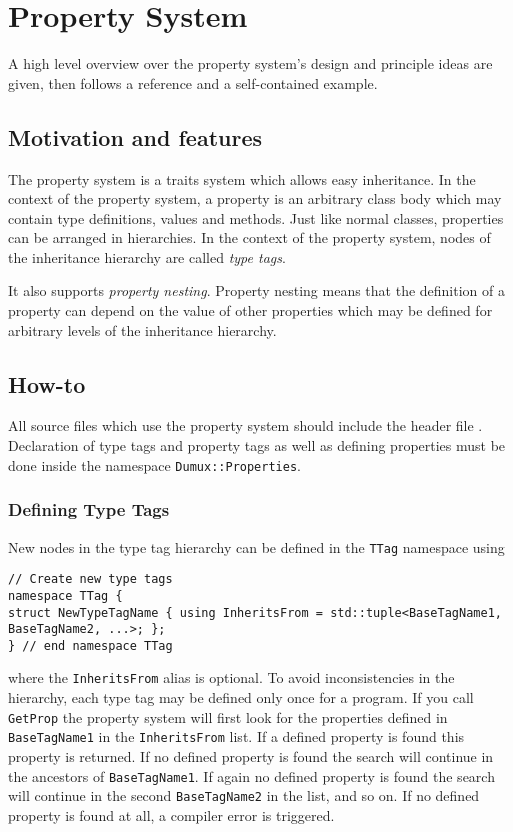 \section{Property System}
\label{sec:propertysystem}
A high level overview over the property system's design and principle ideas
are given, then follows a reference and a self-contained example.

\subsection{Motivation and features}
The \Dumux property system is a traits system
which allows easy inheritance.
In the context of the \Dumux property system, a property is an arbitrary
class body which may contain type definitions, values and methods.
Just like normal classes, properties can be arranged in hierarchies. In
the context of the \Dumux property system, nodes of the inheritance
hierarchy are called \emph{type tags}.

It also supports \emph{property nesting}. Property nesting means that the definition of
a property can depend on the value of other properties which may be
defined for arbitrary levels of the inheritance hierarchy.

\subsection{How-to}
All source files which use the property system should include
the header file .
Declaration of type tags and
property tags as well as defining properties must be done inside the
namespace \texttt{Dumux::Properties}.

\subsubsection{Defining Type Tags}
New nodes in the type tag hierarchy can be defined in the \texttt{TTag} namespace using
\begin{lstlisting}[style=DumuxCode]
// Create new type tags
namespace TTag {
struct NewTypeTagName { using InheritsFrom = std::tuple<BaseTagName1, BaseTagName2, ...>; };
} // end namespace TTag
\end{lstlisting}
where the \texttt{InheritsFrom} alias is optional. To avoid
inconsistencies in the hierarchy, each type tag may be defined only
once for a program. If you call \texttt{GetProp} the property system will first look for the properties defined in \texttt{BaseTagName1} in the \texttt{InheritsFrom} list.
If a defined property is found this property is returned. If no defined property is found the search will continue in the ancestors of \texttt{BaseTagName1}.
If again no defined property is found the search will continue in the second \texttt{BaseTagName2} in the list, and so on.
If no defined property is found at all, a compiler error is triggered.

